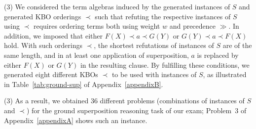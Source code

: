 
\noindent(3) We considered the term algebras induced by the generated
instances of $S$ and  generated KBO orderings $\prec$ such that
refuting the respective instances of $S$ using $\prec$ requires
ordering terms both using weight $w$ and precedence $\gg$. %
In addition, we imposed that  either $F(X) \prec a \prec G(Y)$ 
or $G(Y) \prec a \prec F(X)$ hold. With such orderings $\prec$,
the shortest refutations of instances of $S$ are of the same length, and in
at least one application of superposition, $a$ is replaced by either $F(X)$ or $G(Y)$
in the resulting clause. %
By fulfilling these conditions, we generated eight
different KBOs $\prec$ to be used with instances of $S$, as
illustrated in Table~\ref{tab:ground-sup} of Appendix~\ref{appendixB}. \smallskip

\noindent(3) As a result, we obtained 36 different problems (combinations of
instances of $S$ and $\prec$) for  the ground
superposition reasoning task of our exam; Problem~3 of
Appendix~\ref{appendixA} shows such an instance.

